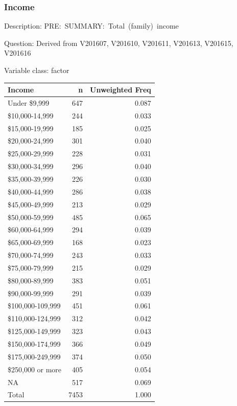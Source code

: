 \documentclass[
]{krantz}
\begin{document}
\hypertarget{income}{%
\subsubsection*{Income}\label{income}}


Description: PRE:~SUMMARY:~Total~(family)~income

Question: Derived from V201607, V201610, V201611, V201613, V201615, V201616

Variable class: factor

\begin{tabular}[t]{l|r|r}
\hline
Income & n & Unweighted Freq\\
\hline
Under \$9,999 & 647 & 0.087\\
\hline
\$10,000-14,999 & 244 & 0.033\\
\hline
\$15,000-19,999 & 185 & 0.025\\
\hline
\$20,000-24,999 & 301 & 0.040\\
\hline
\$25,000-29,999 & 228 & 0.031\\
\hline
\$30,000-34,999 & 296 & 0.040\\
\hline
\$35,000-39,999 & 226 & 0.030\\
\hline
\$40,000-44,999 & 286 & 0.038\\
\hline
\$45,000-49,999 & 213 & 0.029\\
\hline
\$50,000-59,999 & 485 & 0.065\\
\hline
\$60,000-64,999 & 294 & 0.039\\
\hline
\$65,000-69,999 & 168 & 0.023\\
\hline
\$70,000-74,999 & 243 & 0.033\\
\hline
\$75,000-79,999 & 215 & 0.029\\
\hline
\$80,000-89,999 & 383 & 0.051\\
\hline
\$90,000-99,999 & 291 & 0.039\\
\hline
\$100,000-109,999 & 451 & 0.061\\
\hline
\$110,000-124,999 & 312 & 0.042\\
\hline
\$125,000-149,999 & 323 & 0.043\\
\hline
\$150,000-174,999 & 366 & 0.049\\
\hline
\$175,000-249,999 & 374 & 0.050\\
\hline
\$250,000 or more & 405 & 0.054\\
\hline
NA & 517 & 0.069\\
\hline
Total & 7453 & 1.000\\
\hline
\end{tabular}
\end{document}

